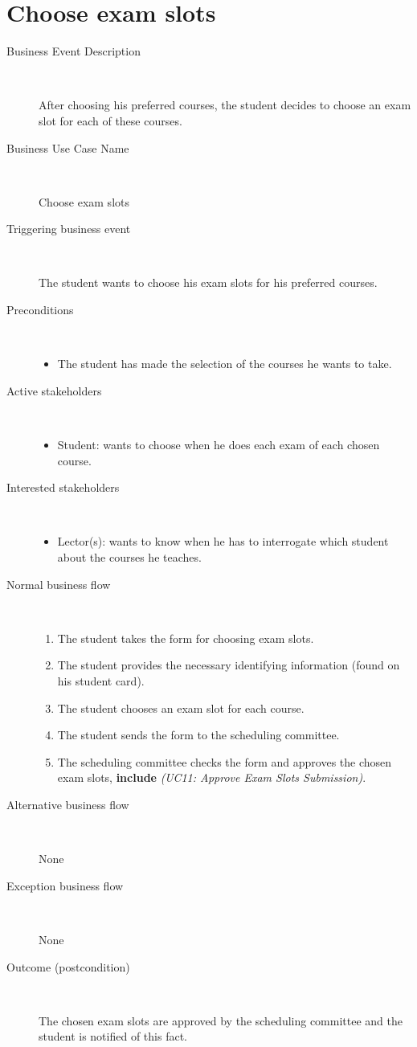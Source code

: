 \section{Choose exam slots}

\begin{description}
	\item[Business Event Description] \ 
		\par After choosing his preferred courses, the student decides to choose an
		exam slot for each of these courses.
	\item[Business Use Case Name] \ 
		\par Choose exam slots
	\item[Triggering business event] \ 
		\par The student wants to choose his exam slots for his preferred courses.
	\item[Preconditions] \
	\begin{itemize}
		\item The student has made the selection of the courses he wants to take.
	\end{itemize}
	\item[Active stakeholders] \ 
	\begin{itemize}
		\item Student: wants to choose when he does each exam of each chosen course.
	\end{itemize}
	\item[Interested stakeholders] \ 
		\begin{itemize}
		\item Lector(s): wants to know when he has to interrogate which student about
		the courses he teaches.
		\end{itemize}
	\item[Normal business flow] \ 
	\begin{enumerate}
	  	\item The student takes the form for choosing exam slots.
	  	\item The student provides the necessary identifying information (found on
	  	his student card).
	  	\item The student chooses an exam slot for each course.
	  	\item The student sends the form to the scheduling committee.
	  	\item The scheduling committee checks the form and approves the chosen exam
	  	slots, \textbf{include} \emph{(UC11: Approve Exam Slots Submission)}.
	\end{enumerate}
	\item[Alternative business flow] \
		\par None 
	\item[Exception business flow] \ 
		\par None
	\item[Outcome (postcondition)] \ 
		\par The chosen exam slots are approved by the scheduling committee and the
		student is notified of this fact.
\end{description}